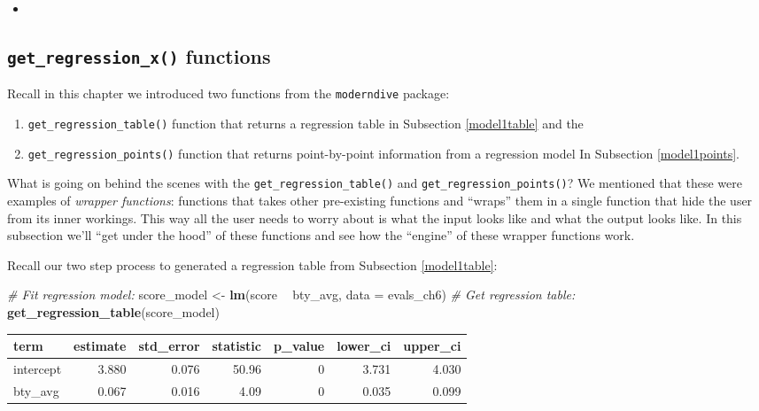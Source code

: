 \documentclass[12pt, krantz2,]{krantz}
\makeatletter
\newenvironment{Shaded}{\begin{snugshade}}{\end{snugshade}}
\newcommand{\CommentTok}[1]{\textcolor[rgb]{0.37,0.37,0.37}{\textit{#1}}}
\newcommand{\DataTypeTok}[1]{\textcolor[rgb]{0.27,0.27,0.27}{#1}}
\newcommand{\KeywordTok}[1]{\textcolor[rgb]{0.27,0.27,0.27}{\textbf{#1}}}
\newcommand{\NormalTok}[1]{#1}
\newcommand{\OperatorTok}[1]{\textcolor[rgb]{0.43,0.43,0.43}{\textbf{#1}}}
\newcommand{\StringTok}[1]{\textcolor[rgb]{0.5,0.5,0.5}{#1}}
\providecommand{\tightlist}{%
  \setlength{\itemsep}{0pt}\setlength{\parskip}{0pt}}
\newenvironment{kframe}{%
\medskip{}
\setlength{\fboxsep}{.8em}
 \def\at@end@of@kframe{}%
 \ifinner\ifhmode%
  \def\at@end@of@kframe{\end{minipage}}%
  \begin{minipage}{\columnwidth}%
 \fi\fi%
 \def\FrameCommand##1{\hskip\@totalleftmargin \hskip-\fboxsep
 \colorbox{shadecolor}{##1}\hskip-\fboxsep
     \hskip-\linewidth \hskip-\@totalleftmargin \hskip\columnwidth}%
 \MakeFramed {\advance\hsize-\width
   \@totalleftmargin\z@ \linewidth\hsize
   \@setminipage}}%
 {\par\unskip\endMakeFramed%
 \at@end@of@kframe}
\renewenvironment{Shaded}{\begin{kframe}}{\end{kframe}}
\newenvironment{rmdblock}[1]
  {\begin{shaded*}
  \begin{itemize}
  \renewcommand{\labelitemi}{
    \raisebox{-.7\height}[0pt][0pt]{
    }
  }
  \item
  }
  {
  \end{itemize}
  \end{shaded*}
  }
\newenvironment{learncheck}
  {\begin{rmdblock}{warning}}
  {\end{rmdblock}}
\makeatother
\begin{document}
\begin{learncheck}

\end{learncheck}

\hypertarget{underthehood}{%
\subsection{\texorpdfstring{\texttt{get\_regression\_x()} functions}{get\_regression\_x() functions}}\label{underthehood}}

Recall in this chapter we introduced two functions from the \texttt{moderndive} package:

\begin{enumerate}
\def\labelenumi{\arabic{enumi}.}
\tightlist
\item
  \texttt{get\_regression\_table()} function that returns a regression table in Subsection \ref{model1table} and the
\item
  \texttt{get\_regression\_points()} function that returns point-by-point information from a regression model In Subsection \ref{model1points}.
\end{enumerate}

What is going on behind the scenes with the \texttt{get\_regression\_table()} and \texttt{get\_regression\_points()}? We mentioned that these were examples of \emph{wrapper functions}: functions that takes other pre-existing functions and ``wraps'' them in a single function that hide the user from its inner workings. This way all the user needs to worry about is what the input looks like and what the output looks like. In this subsection we'll ``get under the hood'' of these functions and see how the ``engine'' of these wrapper functions work.

Recall our two step process to generated a regression table from Subsection \ref{model1table}:

\begin{Shaded}
\begin{Highlighting}[]
\CommentTok{# Fit regression model:}
\NormalTok{score_model <-}\StringTok{ }\KeywordTok{lm}\NormalTok{(score }\OperatorTok{~}\StringTok{ }\NormalTok{bty_avg, }\DataTypeTok{data =}\NormalTok{ evals_ch6)}
\CommentTok{# Get regression table:}
\KeywordTok{get_regression_table}\NormalTok{(score_model)}
\end{Highlighting}
\end{Shaded}

\begin{table}[H]
\centering\begingroup\fontsize{10}{12}\selectfont

\begin{tabular}{l|r|r|r|r|r|r}
\hline
term & estimate & std\_error & statistic & p\_value & lower\_ci & upper\_ci\\
\hline
intercept & 3.880 & 0.076 & 50.96 & 0 & 3.731 & 4.030\\
\hline
bty\_avg & 0.067 & 0.016 & 4.09 & 0 & 0.035 & 0.099\\
\hline
\end{tabular}
\endgroup{}
\end{table}
\end{document}

